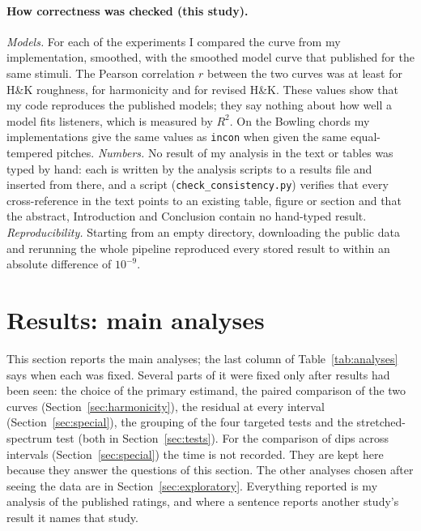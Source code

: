 \documentclass[11pt,a4paper]{article}
\newcommand{\HK}{H\&K}
\begin{document}
\paragraph{How correctness was checked (this study).}
\emph{Models.} For each of the \nValExp{} experiments I compared the curve from my
implementation, smoothed, with the smoothed model curve that \citet{marjieh2024} published
for the same stimuli. The
Pearson correlation $r$ between the two curves was at least \valMinHK{} for \HK{} roughness,
\valMinH{} for harmonicity and \valMinRevHK{} for revised \HK. These values show that my code
reproduces the published models; they say nothing about how well a model fits listeners,
which is measured by $R^2$. On the Bowling chords my implementations give the same values as
\texttt{incon} when given the same equal-tempered pitches. \emph{Numbers.} No result of my analysis in the
text or tables was typed by hand: each is written by the analysis scripts to a results file
and inserted from there, and a script (\texttt{check\_consistency.py}) verifies that every
cross-reference in the text points to an existing table, figure or section and that the abstract, Introduction and Conclusion contain no hand-typed result.
\emph{Reproducibility.} Starting from an empty directory, downloading the public data and
rerunning the whole pipeline reproduced every stored result to within an absolute difference of $10^{-9}$.

\section{Results: main analyses}
\label{sec:results}
This section reports the main analyses; the last column of Table~\ref{tab:analyses} says
when each was fixed. Several parts of it were fixed only after results had been seen: the
choice of the primary estimand, the paired comparison of the two curves
(Section~\ref{sec:harmonicity}), the residual at every interval
(Section~\ref{sec:special}), the grouping of the four targeted tests and the
stretched-spectrum test (both in Section~\ref{sec:tests}). For the comparison of dips across
intervals (Section~\ref{sec:special}) the time is not recorded. They are kept here because
they answer the questions of this section. The other analyses chosen after seeing the data are in Section~\ref{sec:exploratory}. Everything reported is
my analysis of the published ratings, and where a sentence reports another study's result it
names that study.
\end{document}
